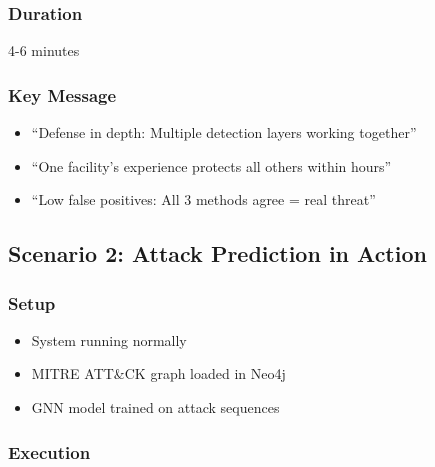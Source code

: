 \documentclass[11pt,a4paper]{article}
\begin{document}
\subsubsection{Duration}
4-6 minutes

\subsubsection{Key Message}
\begin{itemize}[leftmargin=*]
    \item ``Defense in depth: Multiple detection layers working together''
    \item ``One facility's experience protects all others within hours''
    \item ``Low false positives: All 3 methods agree = real threat''
\end{itemize}


\subsection{Scenario 2: Attack Prediction in Action}

\subsubsection{Setup}
\begin{itemize}[leftmargin=*]
    \item System running normally
    \item MITRE ATT\&CK graph loaded in Neo4j
    \item GNN model trained on attack sequences
\end{itemize}

\subsubsection{Execution}
\end{document}
